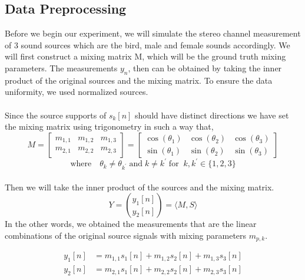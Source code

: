 \documentclass[a4paper,11pt]{article}
\begin{document}
\subsection{Data Preprocessing}
Before we begin our experiment, we will simulate the stereo channel measurement of 3 sound sources which are the bird, male and female sounds accordingly. We will first construct a mixing matrix M, which will be the ground truth mixing parameters. The measurements $y_n$, then can be obtained by taking the inner product of the original sources and the mixing matrix.
To ensure the data uniformity, we used normalized sources.\\
\\
Since the source supports of $s_k[n]$ should have distinct directions we have set the mixing matrix using trigonometry in such a way that,
\begin{equation}
M = 
\begin{bmatrix}m_{1,1}&m_{1,2}&m_{1,3}\\
m_{2,1}&m_{2,2}&m_{2,3}
\end{bmatrix}
= \begin{bmatrix}\cos(\theta_1)&\cos(\theta_2)&\cos(\theta_3)\\
\sin(\theta_1)&\sin(\theta_2)&\sin(\theta_3)
\end{bmatrix}
\end{equation}
\[
\text{where} \quad
\theta_{k} \neq \theta_{k^{'}}\; \text{and} \; k \neq k^{'} \; \text{for} \;\; k, k^{'} \in \{1, 2, 3\}
\]
\\
Then we will take the inner product of the sources and the mixing matrix.
\begin{equation}
    Y = \binom{y_1[n]}{y_2[n]}  = \langle M, S \rangle
\end{equation}
In the other words, we obtained the measurements that are the linear combinations of the original source signals with mixing parameters $m_{p,k}$.

\begin{equation}
\begin{split}
    y_1[n] & = m_{1,1}s_1[n] + m_{1,2}s_2[n] +m_{1,3}s_3[n] \\
    y_2[n] & = m_{2,1}s_1[n] + m_{2,2}s_2[n] +m_{2,3}s_3[n]
\end{split}
\end{equation}
\\
\end{document}
